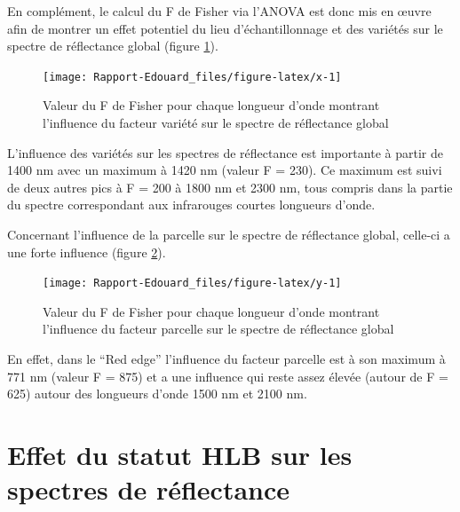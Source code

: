 \documentclass[
  11pt,
  french,
  a4paper,
  extrafontsizes,onecolumn,openright
  ]{memoir}
\begin{document}
En complément, le calcul du F de Fisher via l'ANOVA est donc mis en œuvre afin de montrer un effet potentiel du lieu d'échantillonnage et des variétés sur le spectre de réflectance global (figure \ref{fig:x}).

\scriptsize

\begin{figure}

{\centering \texttt{[image: Rapport-Edouard\_files/figure-latex/x-1]} 

}

\caption{Valeur du F de Fisher pour chaque longueur d’onde montrant l’influence du facteur variété sur le spectre de réflectance global}\label{fig:x}
\end{figure}

\normalsize

\vfill
\newpage

L'influence des variétés sur les spectres de réflectance est importante à partir de 1400 nm avec un maximum à 1420 nm (valeur F = 230). Ce maximum est suivi de deux autres pics à F = 200 à 1800 nm et 2300 nm, tous compris dans la partie du spectre correspondant aux infrarouges courtes longueurs d'onde.

Concernant l'influence de la parcelle sur le spectre de réflectance global, celle-ci a une forte influence (figure \ref{fig:y}).

\scriptsize

\begin{figure}

{\centering \texttt{[image: Rapport-Edouard\_files/figure-latex/y-1]} 

}

\caption{Valeur du F de Fisher pour chaque longueur d’onde montrant l’influence du facteur parcelle sur le spectre de réflectance global}\label{fig:y}
\end{figure}

\normalsize

En effet, dans le ``Red edge'' l'influence du facteur parcelle est à son maximum à 771 nm (valeur F = 875) et a une influence qui reste assez élevée (autour de F = 625) autour des longueurs d'onde 1500 nm et 2100 nm.

\vfill
\newpage

\hypertarget{effet-du-statut-hlb-sur-les-spectres-de-ruxe9flectance}{%
\section{Effet du statut HLB sur les spectres de réflectance}\label{effet-du-statut-hlb-sur-les-spectres-de-ruxe9flectance}}
\end{document}
